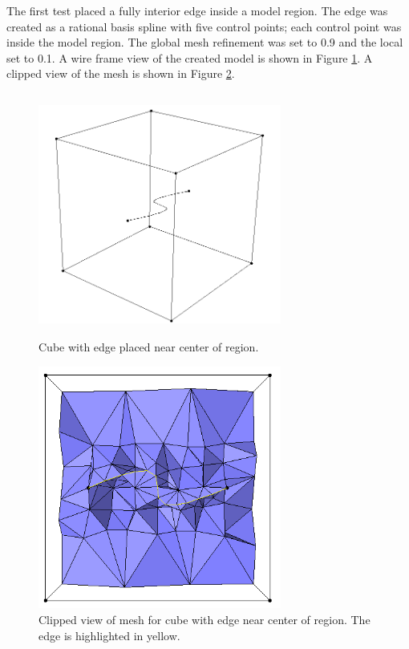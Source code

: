 \documentclass[a4paper, 12pt]{article}
\begin{document}
The first test placed a fully interior edge inside a model region. 
The edge was created as a rational basis spline with five control points; 
each control point was inside the model region.
The global mesh refinement was set to 0.9 and the local set to 0.1. 
A wire frame view of the created model is shown in Figure \ref{fig:edge1model}.
A clipped view of the mesh is shown in Figure \ref{fig:edge1mesh}.

\begin{figure}[H]
  \centering
  \includegraphics[width=8cm, height=8cm]{test6_smd}
  \caption{Cube with edge placed near center of region.}
  \label{fig:edge1model}
\end{figure}

\begin{figure}[H]
  \centering
  \includegraphics[width=8cm, height=8cm]{test6_sms_clipped}
  \caption{Clipped view of mesh for cube with edge near center of region. 
          The edge is highlighted in yellow.}
  \label{fig:edge1mesh}
\end{figure}
\end{document}
